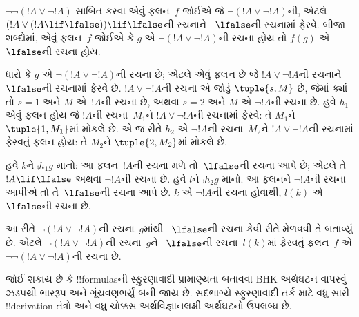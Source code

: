 \documentclass[../../../include/open-logic-section]{subfiles}
\begin{document}
\begin{ex}
$\lnot \lnot (!A \lor \lnot !A)$ સાબિત કરવા એવું ફલન~$f$
જોઈએ જે $\lnot(!A \lor \lnot !A)$ની, એટલે
$(!A \lor (!A \lif \lfalse)) \lif \lfalse$ની રચનાને
~$\lfalse$ની રચનામાં ફેરવે. બીજા શબ્દોમાં, એવું ફલન~$f$
જોઈએ કે $g$ એ $\lnot(!A \lor \lnot !A)$ની રચના હોય તો
$f(g)$ એ~$\lfalse$ની રચના હોય.

ધારો કે $g$ એ $\lnot(!A \lor \lnot !A)$ની રચના છે; એટલે
એવું ફલન છે જે $!A \lor \lnot !A$ની રચનાને~$\lfalse$ની
રચનામાં ફેરવે છે. $!A \lor \lnot !A$ની રચના એ જોડું
$\tuple{s, M}$ છે, જેમાં ક્યાં તો $s = 1$ અને $M$
એ~$!A$ની રચના છે, અથવા $s = 2$ અને $M$ એ $\lnot !A$ની
રચના છે. હવે $h_1$ એવું ફલન હોય જે $!A$ની રચના~$M_1$ને
$!A \lor \lnot !A$ની રચનામાં ફેરવે: તે $M_1$ને
$\tuple{1, M_1}$માં મોકલે છે.
એ જ રીતે $h_2$ એ $\lnot !A$ની રચના~$M_2$ને
$!A \lor \lnot !A$ની રચનામાં ફેરવતું ફલન હોય: તે
$M_2$ને $\tuple{2, M_2}$માં મોકલે છે.

હવે $k$ને $\comp{h_1}{g}$ માનો: આ ફલન~$!A$ની રચના
મળે તો~$\lfalse$ની રચના આપે છે; એટલે તે $!A \lif \lfalse$
અથવા $\lnot !A$ની રચના છે. હવે $l$ને $\comp{h_2}{g}$
માનો. આ ફલનને $\lnot !A$ની રચના આપીએ તો તે~$\lfalse$ની
રચના આપે છે. $k$ એ $\lnot !A$ની રચના હોવાથી, $l(k)$
એ~$\lfalse$ની રચના છે.

આ રીતે $\lnot(!A \lor \lnot !A)$ની રચના~$g$માંથી
~$\lfalse$ની રચના કેવી રીતે મેળવવી તે બતાવ્યું છે.
એટલે $\lnot(!A \lor \lnot !A)$ની રચના~$g$ને
~$\lfalse$ની રચના~$l(k)$માં ફેરવતું ફલન~$f$ એ
$\lnot\lnot(!A \lor \lnot !A)$ની રચના છે.
\end{ex}

જોઈ શકાય છે કે !!{formula}sની સ્ફુરણાવાદી પ્રામાણ્યતા
બતાવવા BHK અર્થઘટન વાપરવું ઝડપથી ભારરૂપ અને ગૂંચવણભર્યું
બની જાય છે. સદભાગ્યે સ્ફુરણાવાદી તર્ક માટે વધુ સારી
!!{derivation} તંત્રો અને વધુ ચોક્કસ અર્થવિજ્ઞાનલક્ષી
અર્થઘટનો ઉપલબ્ધ છે.
\end{document}
